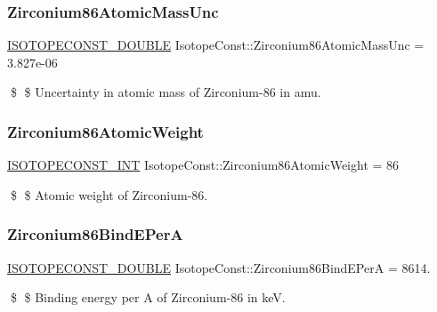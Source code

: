 \subsubsection{\texorpdfstring{Zirconium86\+Atomic\+Mass\+Unc}{Zirconium86AtomicMassUnc}}
{\footnotesize\ttfamily \mbox{\hyperlink{group___isotope_const-_macros_ga8f45a7272ce02c0b4c65c44636ed719a}{I\+S\+O\+T\+O\+P\+E\+C\+O\+N\+S\+T\+\_\+\+D\+O\+U\+B\+LE}} Isotope\+Const\+::\+Zirconium86\+Atomic\+Mass\+Unc = 3.\+827e-\/06}

\$ \$ Uncertainty in atomic mass of Zirconium-\/86 in amu. \mbox{\label{group___isotope_const-_zirconium-_zr86_ga7638d12eca42c7117d8f9b9e2c038703}} 
\subsubsection{\texorpdfstring{Zirconium86\+Atomic\+Weight}{Zirconium86AtomicWeight}}
{\footnotesize\ttfamily \mbox{\hyperlink{group___isotope_const-_macros_ga5f18360b3e99483a35c32d789e62621c}{I\+S\+O\+T\+O\+P\+E\+C\+O\+N\+S\+T\+\_\+\+I\+NT}} Isotope\+Const\+::\+Zirconium86\+Atomic\+Weight = 86}

\$ \$ Atomic weight of Zirconium-\/86. \mbox{\label{group___isotope_const-_zirconium-_zr86_ga3c11bc2b7118f8a920aff5090e9aa21f}} 
\subsubsection{\texorpdfstring{Zirconium86\+Bind\+E\+PerA}{Zirconium86BindEPerA}}
{\footnotesize\ttfamily \mbox{\hyperlink{group___isotope_const-_macros_ga8f45a7272ce02c0b4c65c44636ed719a}{I\+S\+O\+T\+O\+P\+E\+C\+O\+N\+S\+T\+\_\+\+D\+O\+U\+B\+LE}} Isotope\+Const\+::\+Zirconium86\+Bind\+E\+PerA = 8614.}

\$ \$ Binding energy per A of Zirconium-\/86 in keV. \mbox{\label{group___isotope_const-_zirconium-_zr86_ga65456b99a9b0498e6bee10ad9d1bfb2c}} 
